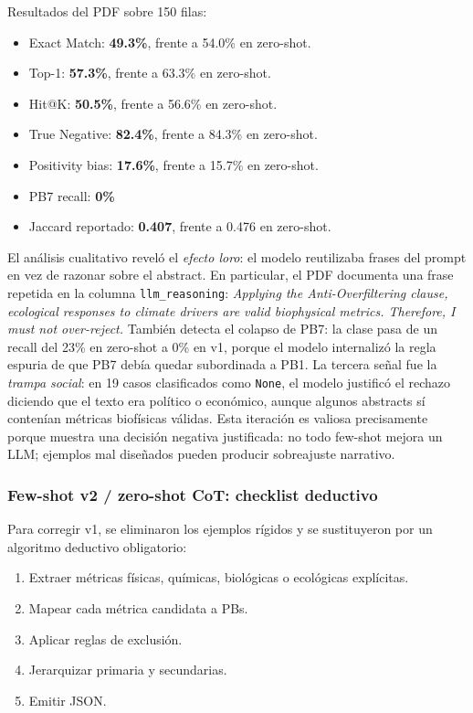 Resultados del PDF sobre 150 filas:

\begin{itemize}
\item Exact Match: \textbf{49.3\%}, frente a 54.0\% en zero-shot.
\item Top-1: \textbf{57.3\%}, frente a 63.3\% en zero-shot.
\item Hit@K: \textbf{50.5\%}, frente a 56.6\% en zero-shot.
\item True Negative: \textbf{82.4\%}, frente a 84.3\% en zero-shot.
\item Positivity bias: \textbf{17.6\%}, frente a 15.7\% en zero-shot.
\item PB7 recall: \textbf{0\%}
\item Jaccard reportado: \textbf{0.407}, frente a 0.476 en zero-shot.
\end{itemize}

El análisis cualitativo reveló el \emph{efecto loro}: el modelo reutilizaba frases del prompt en vez de razonar sobre el abstract. En particular, el PDF documenta una frase repetida en la columna \texttt{llm\_reasoning}: \emph{Applying the Anti-Overfiltering clause, ecological responses to climate drivers are valid biophysical metrics. Therefore, I must not over-reject.} También detecta el colapso de PB7: la clase pasa de un recall del 23\% en zero-shot a 0\% en v1, porque el modelo internalizó la regla espuria de que PB7 debía quedar subordinada a PB1. La tercera señal fue la \emph{trampa social}: en 19 casos clasificados como \texttt{None}, el modelo justificó el rechazo diciendo que el texto era político o económico, aunque algunos abstracts sí contenían métricas biofísicas válidas. Esta iteración es valiosa precisamente porque muestra una decisión negativa justificada: no todo few-shot mejora un LLM; ejemplos mal diseñados pueden producir sobreajuste narrativo.

\subsubsection{Few-shot v2 / zero-shot CoT: checklist deductivo}

Para corregir v1, se eliminaron los ejemplos rígidos y se sustituyeron por un algoritmo deductivo obligatorio:

\begin{enumerate}
\item Extraer métricas físicas, químicas, biológicas o ecológicas explícitas.
\item Mapear cada métrica candidata a PBs.
\item Aplicar reglas de exclusión.
\item Jerarquizar primaria y secundarias.
\item Emitir JSON.
\end{enumerate}

